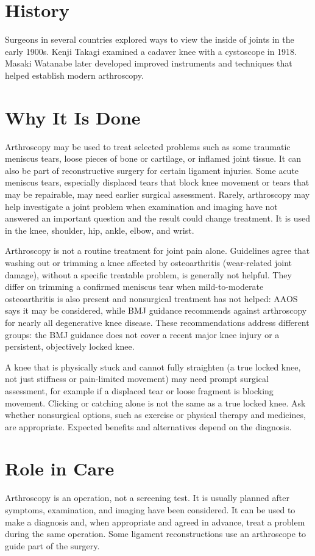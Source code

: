 \section*{History}
Surgeons in several countries explored ways to view the inside of joints in the early 1900s. Kenji Takagi examined a cadaver knee with a cystoscope in 1918. Masaki Watanabe later developed improved instruments and techniques that helped establish modern arthroscopy.

\section*{Why It Is Done}
Arthroscopy may be used to treat selected problems such as some traumatic meniscus tears, loose pieces of bone or cartilage, or inflamed joint tissue. It can also be part of reconstructive surgery for certain ligament injuries. Some acute meniscus tears, especially displaced tears that block knee movement or tears that may be repairable, may need earlier surgical assessment. Rarely, arthroscopy may help investigate a joint problem when examination and imaging have not answered an important question and the result could change treatment. It is used in the knee, shoulder, hip, ankle, elbow, and wrist.

Arthroscopy is not a routine treatment for joint pain alone. Guidelines agree that washing out or trimming a knee affected by osteoarthritis (wear-related joint damage), without a specific treatable problem, is generally not helpful. They differ on trimming a confirmed meniscus tear when mild-to-moderate osteoarthritis is also present and nonsurgical treatment has not helped: AAOS says it may be considered, while BMJ guidance recommends against arthroscopy for nearly all degenerative knee disease. These recommendations address different groups: the BMJ guidance does not cover a recent major knee injury or a persistent, objectively locked knee.

A knee that is physically stuck and cannot fully straighten (a true locked knee, not just stiffness or pain-limited movement) may need prompt surgical assessment, for example if a displaced tear or loose fragment is blocking movement. Clicking or catching alone is not the same as a true locked knee. Ask whether nonsurgical options, such as exercise or physical therapy and medicines, are appropriate. Expected benefits and alternatives depend on the diagnosis.

\section*{Role in Care}
Arthroscopy is an operation, not a screening test. It is usually planned after symptoms, examination, and imaging have been considered. It can be used to make a diagnosis and, when appropriate and agreed in advance, treat a problem during the same operation. Some ligament reconstructions use an arthroscope to guide part of the surgery.

